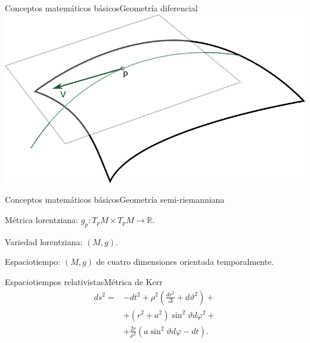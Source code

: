 \begin{frame}{Conceptos matemáticos básicos}{Geometría diferencial}
	\centering
	\includegraphics[height=0.4\paperwidth]{gfx/planotangente}
\end{frame}

\begin{frame}{Conceptos matemáticos básicos}{Geometría semi-riemanniana}
	\large
	\begin{fullpageitemize}
		\item Métrica lorentziana: $g_p \colon T_pM\times T_pM \to \mathbb{R}$.
		\pause
		\item Variedad lorentziana: $(M,g)$.
		\pause
		\item Espaciotiempo: $(M,g)$ de cuatro dimensiones orientada temporalmente.
	\end{fullpageitemize}
\end{frame}



\begin{frame}{Espaciotiempos relativistas}{Métrica de Kerr}
	{\Large
		\begin{align*}
		ds^2 = &-dt^2 + \rho^2\left(\frac{dr^2}{\Delta} + d\vartheta^2\right) + \\
		&+ \left(r^2 + a^2\right)\sin^2\vartheta d\varphi^2 + \\
		\nonumber
		&+ \frac{2r}{\rho^2}\left(a\sin^2\vartheta d\varphi - dt\right).
		\end{align*}
	}
\end{frame}



